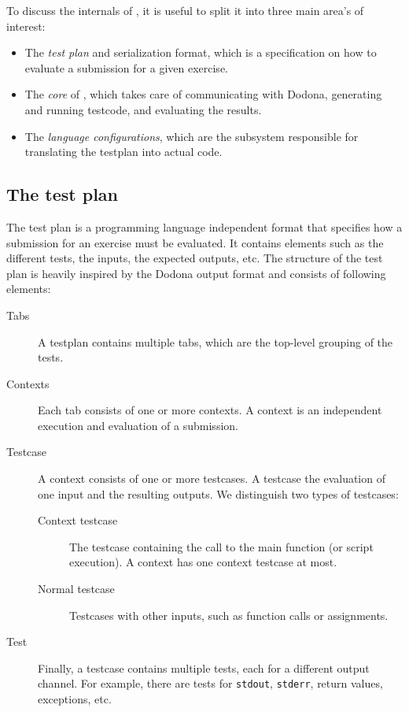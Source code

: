 \documentclass[5p,number]{elsarticle}
\begin{document}
    To discuss the internals of \tested{}, it is useful to split it into three main area's of interest:

    \begin{itemize}
        \item The \emph{test plan} and serialization format, which is a specification on how to evaluate a submission for a given exercise.
        \item The \emph{core} of \tested{}, which takes care of communicating with Dodona, generating and running testcode, and evaluating the results.
        \item The \emph{language configurations}, which are the subsystem responsible for translating the testplan into actual code.
    \end{itemize}

    \subsection{The test plan}\label{subsec:the-test-plan}

    The test plan is a programming language independent format that specifies how a submission for an exercise must be evaluated.
    It contains elements such as the different tests, the inputs, the expected outputs, etc.
    The structure of the test plan is heavily inspired by the Dodona output format and consists of following elements:

    \begin{description}
        \item[Tabs] A testplan contains multiple tabs, which are the top-level grouping of the tests.
        \item[Contexts] Each tab consists of one or more contexts.
        A context is an independent execution and evaluation of a submission.
        \item[Testcase] A context consists of one or more testcases.
        A testcase the evaluation of one input and the resulting outputs.
        We distinguish two types of testcases:
        \begin{description}
            \item[Context testcase] The testcase containing the call to the main function (or script execution).
            A context has one context testcase at most.
            \item[Normal testcase] Testcases with other inputs, such as function calls or assignments.
        \end{description}
        \item[Test] Finally, a testcase contains multiple tests, each for a different output channel.
        For example, there are tests for \texttt{stdout}, \texttt{stderr}, return values, exceptions, etc.
    \end{description}
\end{document}
